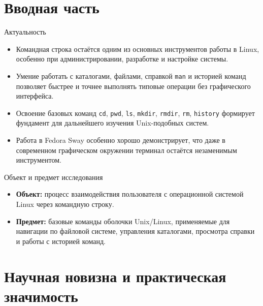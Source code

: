 \documentclass[
  ignorenonframetext,
  aspectratio=169,
  russian,
  aspectratio=169]{beamer}
\providecommand{\tightlist}{%
  \setlength{\itemsep}{0pt}\setlength{\parskip}{0pt}}
\begin{document}
\section{Вводная
часть}\label{ux432ux432ux43eux434ux43dux430ux44f-ux447ux430ux441ux442ux44c}

\begin{frame}[fragile]{Актуальность}
\protect{}\label{ux430ux43aux442ux443ux430ux43bux44cux43dux43eux441ux442ux44c}
\begin{itemize}[<+->]
\tightlist
\item
  Командная строка остаётся одним из основных инструментов работы в
  Linux, особенно при администрировании, разработке и настройке системы.
\item
  Умение работать с каталогами, файлами, справкой \texttt{man} и
  историей команд позволяет быстрее и точнее выполнять типовые операции
  без графического интерфейса.
\item
  Освоение базовых команд \texttt{cd}, \texttt{pwd}, \texttt{ls},
  \texttt{mkdir}, \texttt{rmdir}, \texttt{rm}, \texttt{history}
  формирует фундамент для дальнейшего изучения Unix-подобных систем.
\item
  Работа в Fedora Sway особенно хорошо демонстрирует, что даже в
  современном графическом окружении терминал остаётся незаменимым
  инструментом.
\end{itemize}
\end{frame}

\begin{frame}{Объект и предмет исследования}
\protect{}\label{ux43eux431ux44aux435ux43aux442-ux438-ux43fux440ux435ux434ux43cux435ux442-ux438ux441ux441ux43bux435ux434ux43eux432ux430ux43dux438ux44f}
\begin{itemize}[<+->]
\tightlist
\item
  \textbf{Объект:} процесс взаимодействия пользователя с операционной
  системой Linux через командную строку.
\item
  \textbf{Предмет:} базовые команды оболочки Unix/Linux, применяемые для
  навигации по файловой системе, управления каталогами, просмотра
  справки и работы с историей команд.
\end{itemize}
\end{frame}

\section{Научная новизна и практическая
значимость}\label{ux43dux430ux443ux447ux43dux430ux44f-ux43dux43eux432ux438ux437ux43dux430-ux438-ux43fux440ux430ux43aux442ux438ux447ux435ux441ux43aux430ux44f-ux437ux43dux430ux447ux438ux43cux43eux441ux442ux44c}
\end{document}
